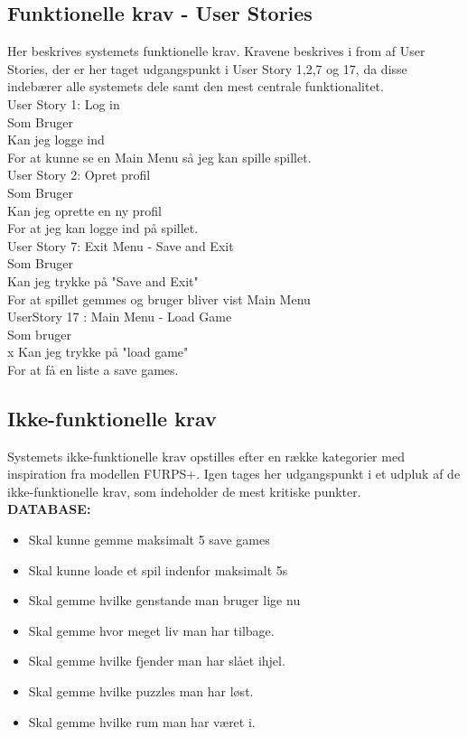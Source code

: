 \subsection{Funktionelle krav - User Stories}
Her beskrives systemets funktionelle krav. Kravene beskrives i from af User Stories, der er her taget udgangspunkt i User Story 1,2,7 og 17, da disse indebærer alle systemets dele samt den mest centrale funktionalitet.\\  
 
User Story 1: Log in \\
  Som Bruger \\
  Kan jeg logge ind \\
  For at kunne se en Main Menu så jeg kan spille spillet. \\
  
User Story 2: Opret profil \\
  Som Bruger \\
  Kan jeg oprette en ny profil \\
  For at jeg kan logge ind på spillet. \\

User Story 7: Exit Menu - Save and Exit\\
  Som Bruger \\
  Kan jeg trykke på "Save and Exit" \\
  For at spillet gemmes og bruger bliver vist Main Menu\\

  
UserStory 17 : Main Menu - Load Game\\
  Som bruger \\x
  Kan jeg trykke på "load game" \\
  For at få en liste a save games.\\


\subsection{Ikke-funktionelle krav}
Systemets ikke-funktionelle krav opstilles efter en række kategorier med inspiration fra modellen FURPS+. Igen tages her udgangspunkt i et udpluk af de ikke-funktionelle krav, som indeholder de mest kritiske punkter.\\

\textbf{DATABASE:}

\begin{itemize}

\item Skal kunne gemme maksimalt 5 save games
\item Skal kunne loade et spil indenfor maksimalt 5s
\item Skal gemme hvilke genstande man bruger lige nu
\item Skal gemme hvor meget liv man har tilbage.
\item Skal gemme hvilke fjender man har slået ihjel.
\item Skal gemme hvilke puzzles man har løst.
\item Skal gemme hvilke rum man har været i.
\end{itemize}

